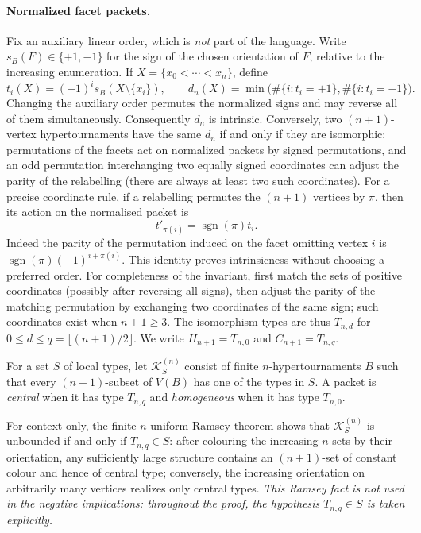 \documentclass[11pt,a4paper]{article}
\theoremstyle{remark}
\newcommand{\K}{\mathcal K}
\begin{document}
\paragraph{Normalized facet packets.}
Fix an auxiliary linear order, which is \emph{not} part of the
language. Write $s_B(F)\in\{+1,-1\}$ for the sign of the chosen
orientation of $F$, relative to the increasing enumeration. If
$X=\{x_0<\cdots<x_n\}$, define
\[
 t_i(X)=(-1)^i s_B(X\setminus\{x_i\}),\qquad
 d_n(X)=\min\bigl(\#\{i:t_i=+1\},\#\{i:t_i=-1\}\bigr).
\]
Changing the auxiliary order permutes the normalized signs and may
reverse all of them simultaneously. Consequently $d_n$ is intrinsic.
Conversely, two $(n+1)$-vertex hypertournaments have the same $d_n$
if and only if they are isomorphic: permutations of the facets act on
normalized packets by signed permutations, and an odd permutation
interchanging two equally signed coordinates can adjust the parity
of the relabelling (there are always at least two such coordinates).
For a precise coordinate rule, if a relabelling permutes the
$(n+1)$ vertices by $\pi$, then its action on the normalised packet is
\[
  t'_{\pi(i)}=\operatorname{sgn}(\pi)t_i.
\]
Indeed the parity of the permutation induced on the facet omitting
vertex $i$ is $\operatorname{sgn}(\pi)(-1)^{i+\pi(i)}$.
This identity proves intrinsicness without choosing a preferred
order. For completeness of the invariant, first match the sets of
positive coordinates (possibly after reversing all signs), then
adjust the parity of the matching permutation by exchanging two
coordinates of the same sign; such coordinates exist when $n+1\ge3$.
The isomorphism types are thus $T_{n,d}$ for
$0\le d\le q=\lfloor(n+1)/2\rfloor$. We write
$H_{n+1}=T_{n,0}$ and $C_{n+1}=T_{n,q}$.

For a set $S$ of local types, let $\K^{(n)}_S$ consist of finite
$n$-hypertournaments $B$ such that every $(n+1)$-subset of $V(B)$
has one of the types in $S$. A packet is \emph{central} when it has
type $T_{n,q}$ and \emph{homogeneous} when it has type $T_{n,0}$.

For context only, the finite $n$-uniform Ramsey theorem shows that $\K^{(n)}_S$ is unbounded if and
only if $T_{n,q}\in S$: after colouring the increasing $n$-sets by their
orientation, any sufficiently large structure contains an
$(n+1)$-set of constant colour and hence of central type; conversely,
the increasing orientation on arbitrarily many vertices realizes only
central types. \emph{This Ramsey fact is not used in the negative
implications: throughout the proof, the hypothesis $T_{n,q}\in S$
is taken explicitly.}
\end{document}
